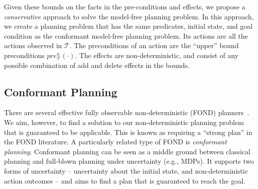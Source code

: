 \documentclass[letterpaper]{article}
\begin{document}
Given these bounds on the facts in the pre-conditions and effects, we propose a {\em conservative} approach to solve the model-free planning problem. In this approach, we create a planning problem that has the same predicates, initial state, and goal condition as the conformant model-free planning problem. Its actions are all the actions observed in $\mathcal{T}$. The preconditions of an action are the ``upper'' bound preconditions $pre_\mathcal{T}^u(\cdot)$. The effects are non-deterministic, and consist of any possible combination of add and delete effects in the bounds. 

\subsection{Conformant Planning}
There are several effective fully observable non-deterministic (FOND) planners~\cite{cimatti2003weak,kissmann2009solving}. We aim, however, to find a  solution to our non-deterministic planning problem that is guaranteed to be applicable. This is known as requiring a ``strong plan'' in the FOND literature. A particularly related type of FOND is {\em conformant planning}. Conformant planning can be seen as a middle ground between classical planning and full-blown planning under uncertainty (e.g., MDPs). It supports two forms of uncertainty -- uncertainty about the initial state, and non-deterministic action outcomes -- and aims to find a plan that is guaranteed to reach the goal.





\end{document}
